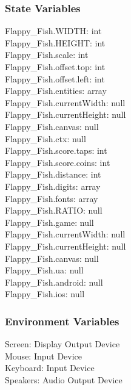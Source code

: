 \documentclass[11pt, oneside]{article}   	%
\begin{document}
\subsubsection*{State Variables}
Flappy\_Fish.WIDTH: int \\
Flappy\_Fish.HEIGHT: int \\
Flappy\_Fish.scale: int \\
Flappy\_Fish.offset.top: int \\
Flappy\_Fish.offset.left: int \\ 
Flappy\_Fish.entities: array \\
Flappy\_Fish.currentWidth: null \\
Flappy\_Fish.currentHeight: null \\
Flappy\_Fish.canvas: null \\ 
Flappy\_Fish.ctx: null \\
Flappy\_Fish.score.taps: int \\
Flappy\_Fish.score.coins: int \\
Flappy\_Fish.distance: int \\
Flappy\_Fish.digits: array \\
Flappy\_Fish.fonts: array \\ 
Flappy\_Fish.RATIO: null \\
Flappy\_Fish.game: null \\
Flappy\_Fish.currentWidth: null \\
Flappy\_Fish.currentHeight: null \\
Flappy\_Fish.canvas: null \\
Flappy\_Fish.ua: null \\
Flappy\_Fish.android: null \\
Flappy\_Fish.ios: null \\

\subsubsection*{Environment Variables}
Screen: Display Output Device \\
Mouse: Input Device \\
Keyboard: Input Device \\
Speakers: Audio Output Device 
\end{document}
